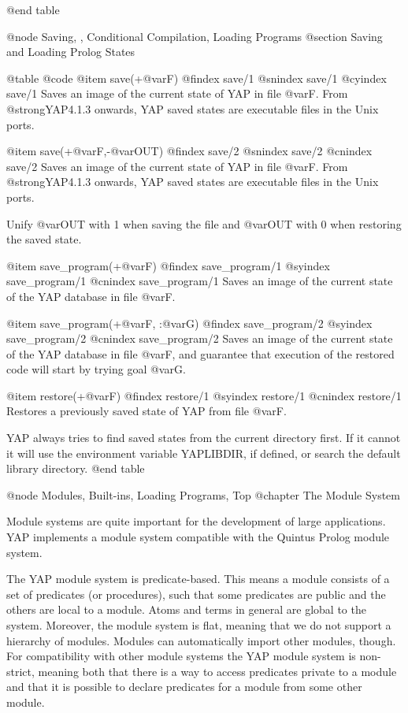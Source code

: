 {{{{@end table

@node Saving, , Conditional Compilation, Loading Programs
@section Saving and Loading Prolog States

@table @code
@item save(+@var{F})
@findex save/1
@snindex save/1
@cyindex save/1
Saves an image of the current state of YAP in file @var{F}. From
@strong{YAP4.1.3} onwards, YAP saved states are executable
files in the Unix ports.

@item save(+@var{F},-@var{OUT})
@findex save/2
@snindex save/2
@cnindex save/2
Saves an image of the current state of YAP in file @var{F}. From
@strong{YAP4.1.3} onwards, YAP saved states are executable
files in the Unix ports.

Unify @var{OUT} with 1 when saving the file and @var{OUT} with 0 when
restoring the saved state.

@item save_program(+@var{F})
@findex save_program/1
@syindex save_program/1
@cnindex save_program/1
Saves an image of the current state of the YAP database in file
@var{F}.

@item save_program(+@var{F}, :@var{G})
@findex save_program/2
@syindex save_program/2
@cnindex save_program/2
Saves an image of the current state of the YAP database in file
@var{F}, and guarantee that execution of the restored code will start by
trying goal @var{G}.

@item restore(+@var{F})
@findex restore/1
@syindex restore/1
@cnindex restore/1
Restores a previously saved state of YAP from file @var{F}.

YAP always tries to find saved states from the current directory
first. If it cannot it will use the environment variable YAPLIBDIR, if
defined, or search the default library directory.
@end table


@node Modules, Built-ins, Loading Programs, Top
@chapter The Module System

Module systems are quite important for the development of large
applications. YAP implements a module system compatible with the Quintus
Prolog module system.

The YAP module system is predicate-based. This means a module consists
of a set of predicates (or procedures), such that some predicates are
public and the others are local to a module. Atoms and terms in general
are global to the system. Moreover, the module system is flat, meaning
that we do not support a hierarchy of modules. Modules can
automatically import other modules, though. For compatibility with other
module systems the YAP module system is non-strict, meaning both that
there is a way to access predicates private to a module and that it
is possible to declare predicates for a module from some other module.

}}}}
